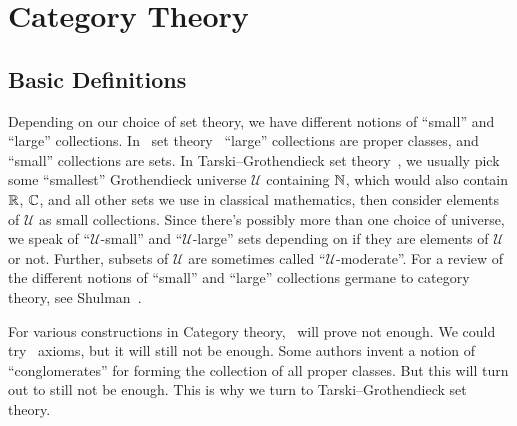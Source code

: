 \chapter{Category Theory}

\section{Basic Definitions}

\begin{node}\label{cat-0002}%
Depending on our choice of set theory, we have different notions of
``small'' and ``large'' collections. In \NBG\ set theory~
``large'' collections are proper classes, and ``small'' collections are
sets. In Tarski--Grothendieck set theory~,
we usually pick some ``smallest'' Grothendieck universe $\mathcal{U}$
containing $\mathbb{N}$, which would also contain $\mathbb{R}$, $\mathbb{C}$, and all other
sets we use in classical mathematics, then consider elements of
$\mathcal{U}$ as small collections. Since there's possibly more than one
choice of universe, we speak of ``$\mathcal{U}$-small'' and
``$\mathcal{U}$-large'' sets depending on if they are elements of
$\mathcal{U}$ or not. Further, subsets of $\mathcal{U}$ are sometimes
called ``$\mathcal{U}$-moderate''. For a review of the different notions
of ``small'' and ``large'' collections germane to category theory, see
Shulman~\cite{shulman2008set}.

For various constructions in Category theory, \NBG\ will prove not
enough. We could try \MK\ axioms, but it will still not be enough. Some
authors invent a notion of ``conglomerates'' for forming the collection
of all proper classes. But this will turn out to still not be enough. This
is why we turn to Tarski--Grothendieck set theory.
\end{node}

